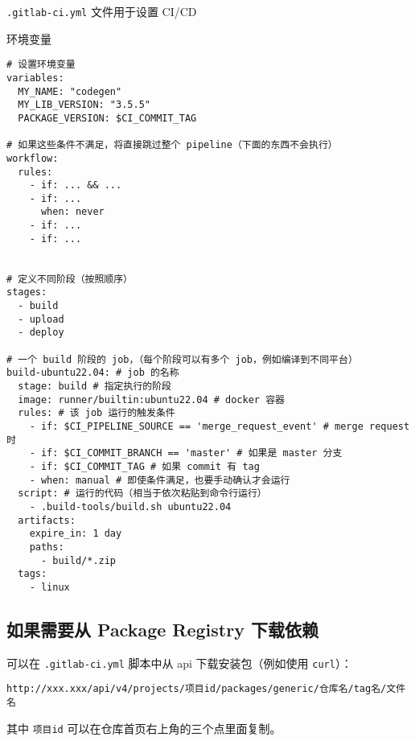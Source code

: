 
\verb`.gitlab-ci.yml` 文件用于设置 CI/CD

环境变量
\begin{lstlisting}[language=none]
# 设置环境变量
variables:
  MY_NAME: "codegen"
  MY_LIB_VERSION: "3.5.5"
  PACKAGE_VERSION: $CI_COMMIT_TAG

# 如果这些条件不满足，将直接跳过整个 pipeline（下面的东西不会执行）
workflow:
  rules:
    - if: ... && ...
    - if: ...
      when: never
    - if: ...
    - if: ...


# 定义不同阶段（按照顺序）
stages:
  - build
  - upload
  - deploy

# 一个 build 阶段的 job，（每个阶段可以有多个 job，例如编译到不同平台）
build-ubuntu22.04: # job 的名称
  stage: build # 指定执行的阶段
  image: runner/builtin:ubuntu22.04 # docker 容器
  rules: # 该 job 运行的触发条件
    - if: $CI_PIPELINE_SOURCE == 'merge_request_event' # merge request 时
    - if: $CI_COMMIT_BRANCH == 'master' # 如果是 master 分支
    - if: $CI_COMMIT_TAG # 如果 commit 有 tag
    - when: manual # 即使条件满足，也要手动确认才会运行
  script: # 运行的代码（相当于依次粘贴到命令行运行）
    - .build-tools/build.sh ubuntu22.04
  artifacts:
    expire_in: 1 day
    paths:
      - build/*.zip
  tags:
    - linux
\end{lstlisting}

\subsection{如果需要从 Package Registry 下载依赖}
可以在 \verb`.gitlab-ci.yml` 脚本中从 api 下载安装包（例如使用 \verb`curl`）：
\begin{lstlisting}[language=none]
http://xxx.xxx/api/v4/projects/项目id/packages/generic/仓库名/tag名/文件名
\end{lstlisting}
其中 \verb`项目id` 可以在仓库首页右上角的三个点里面复制。

